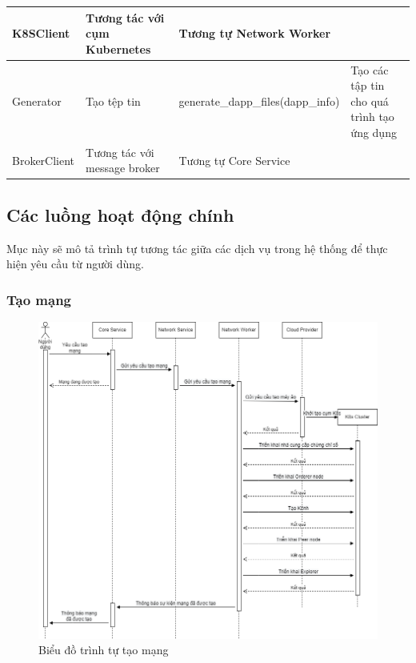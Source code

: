 \documentclass[../DoAn.tex]{subfiles}
\begin{document}
\begin{longtable}{|p{}|p{}|p{}|p{}|}
    K8SClient                                     & Tương tác với cụm Kubernetes                                     & \multicolumn{2}{p{0.525\textwidth}|}{Tương tự Network Worker}                                                                              \\ \hline
    Generator                                     & Tạo tệp tin                                                      & generate\_dapp\_files\hspace{0pt}(dapp\_info)               & Tạo các tập tin cho quá trình tạo ứng dụng                                 \\ \hline
    BrokerClient                                  & Tương tác với message broker                                     & \multicolumn{2}{p{0.525\textwidth}|}{Tương tự Core Service}                                                                                \\ \hline
\end{longtable}

\subsection{Các luồng hoạt động chính}

Mục này sẽ mô tả trình tự tương tác giữa các dịch vụ trong hệ thống để thực
hiện yêu cầu từ người dùng.

\subsubsection{Tạo mạng}

\begin{figure}[H]
    \centering
    \includegraphics[width=0.75\linewidth]{Hinhve/DoAn-SeqCreateNetwork.drawio.png}
    \caption{Biểu đồ trình tự tạo mạng}
    \label{fig:seqCreateNetwork}
\end{figure}
\end{document}
